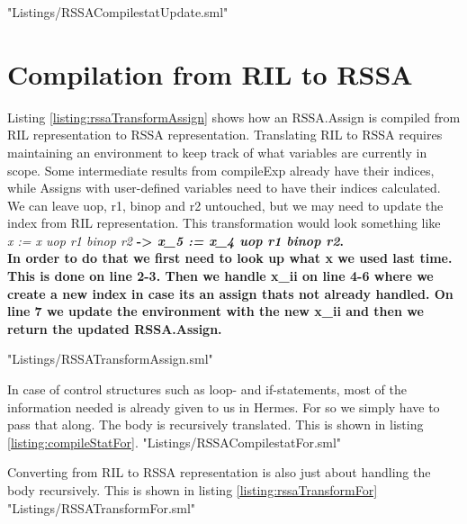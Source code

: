  {"Listings/RSSACompilestatUpdate.sml"}


\section{Compilation from RIL to RSSA}
Listing \ref{listing:rssaTransformAssign} shows how an RSSA.Assign is compiled from RIL representation to RSSA representation. Translating RIL to RSSA requires maintaining an environment to keep track of what variables are currently in scope. Some intermediate results from compileExp already have their indices, while Assigns with user-defined variables need to have their indices calculated. We can leave uop, r1, binop and r2 untouched, but we may need to update the index from RIL representation. This transformation would look something like \\
\emph{x := x uop r1 binop r2} \bf{->} \emph{x\_5 := x\_4 uop r1 binop r2}. \\
In order to do that we first need to look up what x we used last time. This is done on line 2-3. Then we handle x\_ii on line 4-6 where we create a new index in case its an assign thats not already handled. On line 7 we update the environment with the new x\_ii and then we return the updated RSSA.Assign.

 {"Listings/RSSATransformAssign.sml"}

In case of control structures such as loop- and if-statements, most of the information needed is already given to us in Hermes. For so we simply have to pass that along. The body is recursively translated. This is shown in listing \ref{listing:compileStatFor}.
 {"Listings/RSSACompilestatFor.sml"}

Converting from RIL to RSSA representation is also just about handling the body recursively. This is shown in listing \ref{listing:rssaTransformFor}
 {"Listings/RSSATransformFor.sml"}


